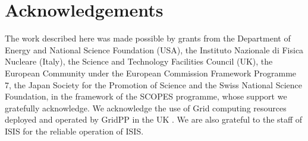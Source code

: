 \section{Acknowledgements}
\label{Sect:Acknowledgements}

The work described here was made possible by grants from the Department of Energy and National Science Foundation (USA), the Instituto Nazionale di Fisica Nucleare (Italy), 
the Science and Technology Facilities Council (UK), the European Community under the European Commission Framework Programme 7, the Japan Society for the Promotion of 
Science and the Swiss National Science Foundation, in the framework of the SCOPES programme, whose support we gratefully acknowledge. We acknowledge the use of Grid 
computing resources deployed and operated by GridPP in the UK \cite{grid_pp_2009}. We are also grateful to the staff of ISIS for the reliable operation of ISIS.

